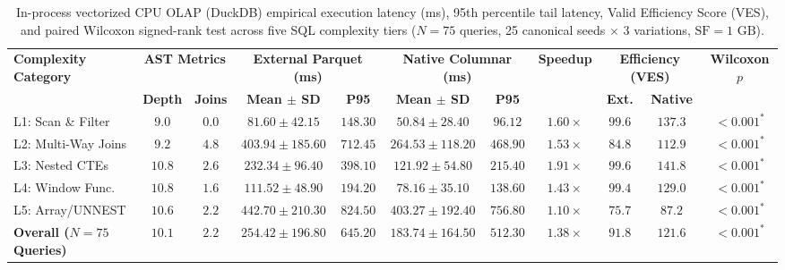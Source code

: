 \documentclass[10pt,a4paper]{article}
\begin{document}
\begin{table}[!t]
\centering
\caption{In-process vectorized CPU OLAP (DuckDB) empirical execution latency (ms), 95th percentile tail latency, Valid Efficiency Score (VES), and paired Wilcoxon signed-rank test across five SQL complexity tiers ($N=75$ queries, 25 canonical seeds $\times$ 3 variations, $\text{SF}=1\text{ GB}$).}
\label{tab:empirical_complexity_results}
\scriptsize
\setlength{\tabcolsep}{4.2pt}
\renewcommand{\arraystretch}{1.12}
\begin{tabular}{@{}lcccccccccc@{}}
\toprule
\multirow{2}{*}{\textbf{Complexity Category}} & \multicolumn{2}{c}{\textbf{AST Metrics}} & \multicolumn{2}{c}{\textbf{External Parquet (ms)}} & \multicolumn{2}{c}{\textbf{Native Columnar (ms)}} & \multirow{2}{*}{\textbf{Speedup}} & \multicolumn{2}{c}{\textbf{Efficiency (VES)}} & \multirow{2}{*}{\textbf{Wilcoxon $p$}} \\
\cmidrule(lr){2-3} \cmidrule(lr){4-5} \cmidrule(lr){6-7} \cmidrule(lr){9-10}
 & \textbf{Depth} & \textbf{Joins} & \textbf{Mean $\pm$ SD} & \textbf{P95} & \textbf{Mean $\pm$ SD} & \textbf{P95} & & \textbf{Ext.} & \textbf{Native} & \\
\midrule
L1: Scan \& Filter & $9.0$ & $0.0$ & $81.60 \pm 42.15$ & $148.30$ & $\mathbf{50.84 \pm 28.40}$ & $\mathbf{96.12}$ & $1.60\times$ & $99.6$ & $\mathbf{137.3}$ & $<0.001^{*}$ \\
L2: Multi-Way Joins & $9.2$ & $4.8$ & $403.94 \pm 185.60$ & $712.45$ & $\mathbf{264.53 \pm 118.20}$ & $\mathbf{468.90}$ & $1.53\times$ & $84.8$ & $\mathbf{112.9}$ & $<0.001^{*}$ \\
L3: Nested CTEs & $10.8$ & $2.6$ & $232.34 \pm 96.40$ & $398.10$ & $\mathbf{121.92 \pm 54.80}$ & $\mathbf{215.40}$ & $1.91\times$ & $99.6$ & $\mathbf{141.8}$ & $<0.001^{*}$ \\
L4: Window Func. & $10.8$ & $1.6$ & $111.52 \pm 48.90$ & $194.20$ & $\mathbf{78.16 \pm 35.10}$ & $\mathbf{138.60}$ & $1.43\times$ & $99.4$ & $\mathbf{129.0}$ & $<0.001^{*}$ \\
L5: Array/UNNEST & $10.6$ & $2.2$ & $442.70 \pm 210.30$ & $824.50$ & $\mathbf{403.27 \pm 192.40}$ & $\mathbf{756.80}$ & $1.10\times$ & $75.7$ & $\mathbf{87.2}$ & $<0.001^{*}$ \\
\midrule
\textbf{Overall ($N=75$ Queries)} & $\mathbf{10.1}$ & $\mathbf{2.2}$ & $\mathbf{254.42 \pm 196.80}$ & $\mathbf{645.20}$ & $\mathbf{183.74 \pm 164.50}$ & $\mathbf{512.30}$ & $\mathbf{1.38\times}$ & $\mathbf{91.8}$ & $\mathbf{121.6}$ & $\mathbf{<0.001^{*}}$ \\

\end{tabular}
\end{table}
\end{document}
